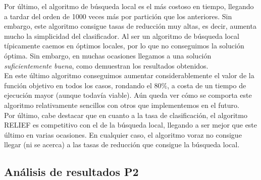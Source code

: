 \documentclass[12pt]{article}
\begin{document}
Por último, el algoritmo de búsqueda local es el más costoso en tiempo, llegando a tardar del orden de 1000 veces más por partición que los anteriores. Sin embargo, este algoritmo consigue tasas de reducción muy altas, es decir, aumenta mucho la simplicidad del clasificador. Al ser un algoritmo de búsqueda local típicamente caemos en óptimos locales, por lo que no conseguimos la solución óptima. Sin embargo, en muchas ocasiones llegamos a una solución \textit{suficientemente buena}, como demuestran los resultados obtenidos.\\

En este último algoritmo conseguimos aumentar considerablemente el valor de la función objetivo en todos los casos, rondando el 80$\%$, a costa de un tiempo de ejecución mayor (aunque todavía viable). Aún queda ver cómo se comporta este algoritmo relativamente sencillos con otros que implementemos en el futuro.\\

Por último, cabe destacar que en cuanto a la tasa de clasificación, el algoritmo RELIEF es competitivo con el de la búsqueda local, llegando a ser mejor que este último en varias ocasiones. En cualquier caso, el algoritmo voraz no consigue llegar (ni se acerca) a las tasas de reducción que consigue la búsqueda local.

\subsection*{Análisis de resultados P2}
\label{analisis}
\end{document}
